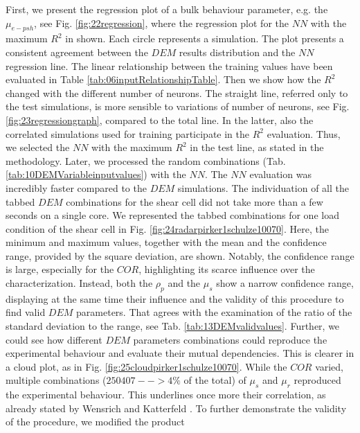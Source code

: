 First, we present the regression plot of a bulk behaviour parameter, e.g. the
$\mu_{e-psh}$, see Fig. \ref{fig:22regression}, where the regression plot for
the $NN$ with the maximum $R^2$ in shown. Each circle represents a simulation. 
The plot presents a consistent agreement between the $DEM$ results distribution and the $NN$ regression line.
% 
The linear relationship between the
training values have been evaluated in Table \ref{tab:06inputRelationshipTable}.
% 
Then we show how the $R^2$ changed with the different number of neurons. The
straight line, referred only to the test simulations, is more sensible to
variations of number of neurons, see Fig. \ref{fig:23regressiongraph}, compared
to the total line. In the latter, also the correlated simulations used for
training participate in the $R^2$ evaluation.
% 
Thus, we selected the $NN$ with the maximum $R^2$ in the test line, as stated in the methodology.
Later, we processed the random combinations (Tab.
\ref{tab:10DEMVariableinputvalues}) with the $NN$.
The $NN$ evaluation was incredibly faster compared to the $DEM$ simulations. The
individuation of all the tabbed $DEM$ combinations for the shear cell did not take more than a few seconds on a single core. 
We represented the tabbed combinations for one load condition of the shear cell in Fig.
\ref{fig:24radarpirker1schulze10070}.
% 
Here, the minimum and maximum values, together with the mean and the confidence
range, provided by the square deviation, are shown. Notably, the confidence range is large, 
especially for the $COR$, highlighting its scarce influence over the characterization. 
Instead, both the $\rho_p$  and the $\mu_s$ show a narrow confidence range, 
displaying at the same time their influence and the validity of this procedure to find valid $DEM$ parameters. 
That agrees with the examination of the ratio of the standard deviation to the
range, see Tab. \ref{tab:13DEMvalidvalues}.
Further, we could see how different $DEM$ parameters
combinations could reproduce the experimental behaviour and evaluate their mutual dependencies. 
This is clearer in a cloud plot, as in Fig. 
\ref{fig:25cloudpirker1schulze10070}. While the $COR$ varied, multiple
combinations ($250407 --> 4\% $ of the total) of $\mu_s$ and $\mu_r$ reproduced
the experimental behaviour.
This underlines once more their correlation, as already stated by Wensrich and 
Katterfeld \cite{RefWorks:87}.
To further demonstrate the validity of the procedure, we modified the product
